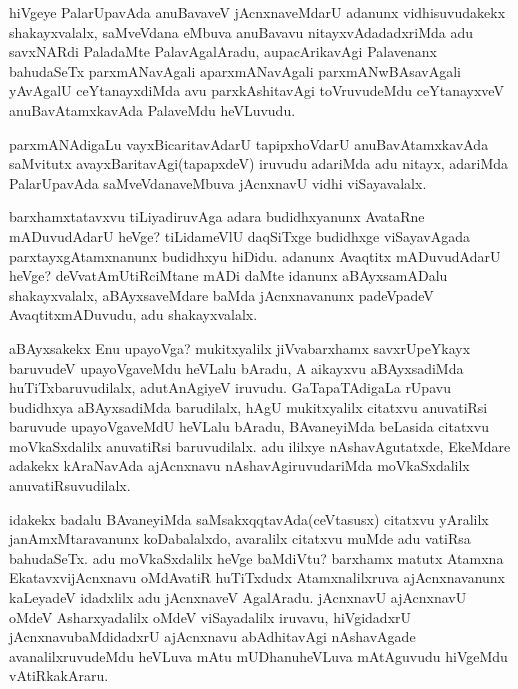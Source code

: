 \begin{artha}
hiVgeye PalarUpavAda anuBavaveV jAcnxnaveMdarU adanunx vidhisuvudakekx
shakayxvalalx, saMveVdana eMbuva anuBavavu nitayxvAdadadxriMda adu
savxNARdi PaladaMte PalavAgalAradu, aupacArikavAgi Palavenanx
bahudaSeTx parxmANavAgali  aparxmANavAgali parxmANwBAsavAgali yAvAgalU
ceYtanayxdiMda avu parxkAshitavAgi toVruvudeMdu ceYtanayxveV
anuBavAtamxkavAda PalaveMdu heVLuvudu.

parxmANAdigaLu vayxBicaritavAdarU tapipxhoVdarU anuBavAtamxkavAda
saMvitutx avayxBaritavAgi(tapapxdeV) iruvudu adariMda adu nitayx,
adariMda PalarUpavAda saMveVdanaveMbuva jAcnxnavU vidhi viSayavalalx.
\end{artha}

\centerline{}

\begin{artha}
barxhamxtatavxvu tiLiyadiruvAga adara budidhxyanunx AvataRne
mADuvudAdarU heVge? tiLidameVlU daqSiTxge budidhxge viSayavAgada
parxtayxgAtamxnanunx budidhxyu hiDidu. adanunx Avaqtitx mADuvudAdarU
heVge? deVvatAmUtiRciMtane mADi daMte idanunx aBAyxsamADalu
shakayxvalalx, aBAyxsaveMdare baMda jAcnxnavanunx padeVpadeV
AvaqtitxmADuvudu, adu shakayxvalalx.
\end{artha}

\centerline{}

\begin{artha}
aBAyxsakekx Enu upayoVga? mukitxyalilx jiVvabarxhamx savxrUpeYkayx
baruvudeV upayoVgaveMdu heVLalu bAradu, A aikayxvu aBAyxsadiMda
huTiTxbaruvudilalx, adutAnAgiyeV iruvudu. GaTapaTAdigaLa rUpavu
budidhxya aBAyxsadiMda barudilalx, hAgU mukitxyalilx citatxvu
anuvatiRsi baruvude upayoVgaveMdU heVLalu bAradu, BAvaneyiMda beLasida
citatxvu moVkaSxdalilx anuvatiRsi baruvudilalx. adu ililxye
nAshavAgutatxde, EkeMdare adakekx kAraNavAda ajAcnxnavu
nAshavAgiruvudariMda moVkaSxdalilx anuvatiRsuvudilalx.

idakekx badalu BAvaneyiMda saMsakxqqtavAda(ceVtasusx) citatxvu
yAralilx janAmxMtaravanunx koDabalalxdo, avaralilx citatxvu muMde adu
vatiRsa bahudaSeTx. adu moVkaSxdalilx heVge baMdiVtu? barxhamx matutx
Atamxna EkatavxvijAcnxnavu oMdAvatiR huTiTxdudx Atamxnalilxruva
ajAcnxnavanunx kaLeyadeV idadxlilx adu jAcnxnaveV
AgalAradu. jAcnxnavU ajAcnxnavU oMdeV Asharxyadalilx oMdeV
viSayadalilx iruvavu, hiVgidadxrU jAcnxnavubaMdidadxrU ajAcnxnavu
abAdhitavAgi nAshavAgade avanalilxruvudeMdu heVLuva mAtu mUDhanuheVLuva
mAtAguvudu hiVgeMdu vAtiRkakAraru.
\end{artha}

